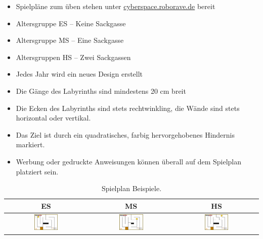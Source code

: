 \documentclass[a4paper,12pt]{article}
\begin{document}
\begin{itemize}
	\item Spielpläne zum üben stehen unter
\href{https://www.cyberspace.roborave.de/lab/}{cyberspace.roborave.de} bereit
	\item Altersgruppe ES – Keine Sackgasse
	\item Altersgruppe MS – Eine Sackgasse
	\item Altersgruppen HS – Zwei Sackgassen
	\item Jedes Jahr wird ein neues Design erstellt
	\item Die Gänge des Labyrinths sind mindestens 20 cm breit
	\item Die Ecken des Labyrinths sind stets rechtwinkling, die Wände sind
		stets horizontal oder vertikal.
	\item Das Ziel ist durch ein quadratisches, farbig hervorgehobenes
		Hindernis markiert.
	\item Werbung oder gedruckte Anweisungen können überall
		auf dem Spielplan platziert sein.
\end{itemize}

\begin{center}
\begin{table}
	\begin{tabular}{|c|c|c|} \hline
		ES & MS & HS \\
		\hline
\includegraphics[width=0.3\textwidth]{images/cyberspace/labyrinth_es.png}
&
\includegraphics[width=0.3\textwidth]{images/cyberspace/labyrinth_ms.png}
&
\includegraphics[width=0.3\textwidth]{images/cyberspace/labyrinth_hs.png}
\\
    		\hline
	\end{tabular}
\caption{\label{tab:table-name}Spielplan Beispiele.}
\end{table}
\end{center}
\end{document}

